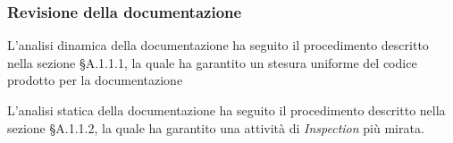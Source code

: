 \subsubsection{Revisione della documentazione}

L'analisi dinamica della documentazione ha seguito il procedimento descritto nella sezione §A.1.1.1, la quale ha garantito un stesura uniforme del codice prodotto per la documentazione

L'analisi statica della documentazione ha seguito il procedimento descritto nella sezione §A.1.1.2, la quale ha garantito una attività di \textit{Inspection} più mirata.